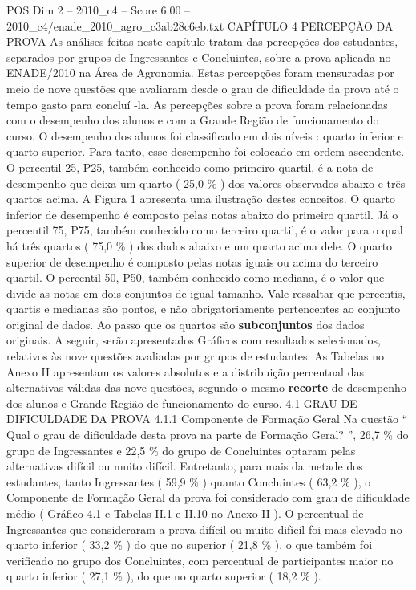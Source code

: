 \begin{textsample}{POS Dim 2 – 2010\_c4 – Score 6.00 – 2010\_c4/enade\_2010\_agro\_c3ab28c6eb.txt}  \label{ex:f2_pos_142}
CAPÍTULO 4 PERCEPÇÃO DA PROVA As análises feitas neste capítulo tratam das percepções dos estudantes, separados por grupos de Ingressantes e Concluintes, sobre a prova aplicada no ENADE/2010 na Área de Agronomia.
Estas percepções foram mensuradas por meio de nove questões que avaliaram desde o grau de dificuldade da prova até o tempo gasto para concluí -la.
As percepções sobre a prova foram relacionadas com o desempenho dos alunos e com a Grande Região de funcionamento do curso.
O desempenho dos alunos foi classificado em dois níveis : quarto inferior e quarto superior.
Para tanto, esse desempenho foi colocado em ordem ascendente.
O percentil 25, P25, também conhecido como primeiro quartil, é a nota de desempenho que deixa um quarto ( 25,0 \% ) dos valores observados abaixo e três quartos acima.
A Figura 1 apresenta uma ilustração destes conceitos.
O quarto inferior de desempenho é composto pelas notas abaixo do primeiro quartil.
Já o percentil 75, P75, também conhecido como terceiro quartil, é o valor para o qual há três quartos ( 75,0 \% ) dos dados abaixo e um quarto acima dele.
O quarto superior de desempenho é composto pelas notas iguais ou acima do terceiro quartil.
O percentil 50, P50, também conhecido como mediana, é o valor que divide as notas em dois conjuntos de igual tamanho.
Vale ressaltar que percentis, quartis e medianas são pontos, e não obrigatoriamente pertencentes ao conjunto original de dados.
Ao passo que os quartos são \textbf{subconjuntos} dos dados originais.
A seguir, serão apresentados Gráficos com resultados selecionados, relativos às nove questões avaliadas por grupos de estudantes.
As Tabelas no Anexo II apresentam os valores absolutos e a distribuição percentual das alternativas válidas das nove questões, segundo o mesmo \textbf{recorte} de desempenho dos alunos e Grande Região de funcionamento do curso. 4.1 GRAU DE DIFICULDADE DA PROVA 4.1.1 Componente de Formação Geral Na questão “ Qual o grau de dificuldade desta prova na parte de Formação Geral? ”, 26,7 \% do grupo de Ingressantes e 22,5 \% do grupo de Concluintes optaram pelas alternativas difícil ou muito difícil.
Entretanto, para mais da metade dos estudantes, tanto Ingressantes ( 59,9 \% ) quanto Concluintes ( 63,2 \% ), o Componente de Formação Geral da prova foi considerado com grau de dificuldade médio ( Gráfico 4.1 e Tabelas II.1 e II.10 no Anexo II ).
O percentual de Ingressantes que consideraram a prova difícil ou muito difícil foi mais elevado no quarto inferior ( 33,2 \% ) do que no superior ( 21,8 \% ), o que também foi verificado no grupo dos Concluintes, com percentual de participantes maior no quarto inferior ( 27,1 \% ), do que no quarto superior ( 18,2 \% ).

\end{textsample}
